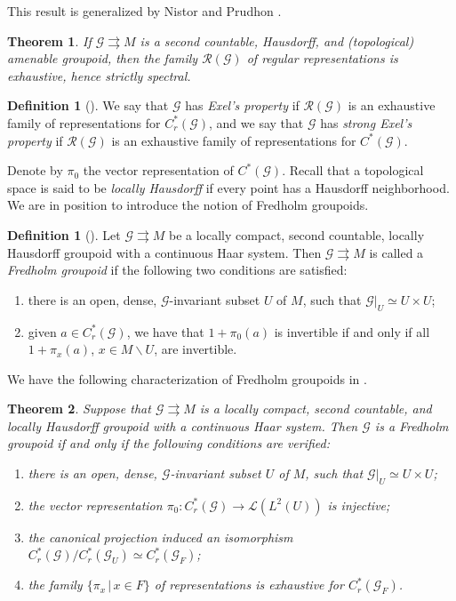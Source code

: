 \documentclass[a4paper]{amsart}
\newcommand{\tto}{\rightrightarrows}
\newcommand{\maG}{\mathcal G}
\newcommand{\maL}{\mathcal L}
\newcommand{\maR}{\mathcal R}
\newcommand\<{\langle}
\renewcommand\>{\rangle}
\newtheorem{thm}{Theorem}[section]
\theoremstyle{definition}
\newtheorem{defn}[theorem]{Definition}
\theoremstyle{remark}
\begin{document}
This result is generalized by Nistor and Prudhon \cite[Theorem 3.18]{NP17}.

\begin{thm}
If $\maG \tto M$ is a second countable, Hausdorff, and (topological) amenable groupoid, then the family $\maR(\maG)$ of regular representations
is exhaustive, hence strictly spectral.
\end{thm}

\begin{defn}[\cite{CNY18}]
We say that $\maG$ has {\em Exel's property} if $\maR(\maG)$ is an exhaustive family of representations for $C^*_r(\maG)$, and
we say that $\maG$ has {\em strong Exel's property} if $\maR(\maG)$ is an exhaustive family of representations for $C^*(\maG)$.
\end{defn}

Denote by $\pi_0$ the vector representation of $C^*(\maG)$. Recall that a topological space is said to be {\em locally Hausdorff} if every point has a Hausdorff neighborhood. We are in position to introduce the notion of Fredholm groupoids.

\begin{defn}[\cite{CNY17,CNY18}]
Let $\maG \tto M$ be a locally compact, second countable, locally Hausdorff groupoid with a continuous Haar system. Then $\maG\tto M$ is called a {\em Fredholm groupoid} if the following two conditions are satisfied:
\begin{enumerate}
\item there is an open, dense, $\maG$-invariant subset $U$ of $M$, such that $\maG\big|_U \simeq U\times U$;
\item given $a\in C^*_r(\maG)$, we have that $1+ \pi_0(a)$ is invertible if and only if all $1+\pi_x(a)$, $x\in M \backslash U$, are invertible.
\end{enumerate}
\end{defn}

We have the following characterization of Fredholm groupoids in \cite{CNY17, CNY18}.
\begin{thm}
Suppose that $\maG \tto M$ is a locally compact, second countable, and locally Hausdorff groupoid with a continuous Haar system. Then $\maG$ is a Fredholm groupoid if and only if the following conditions are verified:
\begin{enumerate}
\item there is an open, dense, $\maG$-invariant subset $U$ of $M$, such that $\maG\big|_U \simeq U\times U$;
\item the vector representation $\pi_0: C^*_r(\maG) \rightarrow \maL(L^2(U))$ is injective;
\item the canonical projection induced an isomorphism $C^*_r(\maG)/ C^*_r(\maG_U) \simeq C^*_r(\maG_F)$;
\item the family $\{\pi_x \, | \, x\in F \}$ of representations is exhaustive for $C^*_r(\maG_F)$.
\end{enumerate}
\end{thm}
\end{document}
